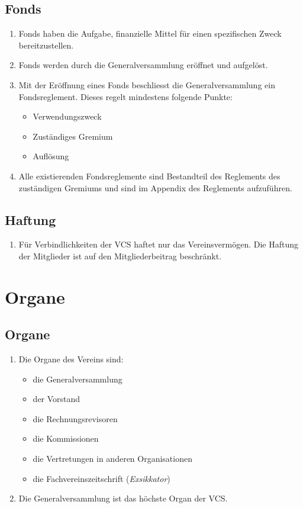 \subsection{Fonds}
\begin{enumerate}
  \item Fonds haben die Aufgabe, finanzielle Mittel für einen spezifischen Zweck bereitzustellen.
  \item Fonds werden durch die Generalversammlung eröffnet und aufgelöst.
  \item Mit der Eröffnung eines Fonds beschliesst die Generalversammlung ein Fondsreglement. Dieses regelt mindestens folgende Punkte:
    \begin{itemize}
      \item Verwendungszweck
      \item Zuständiges Gremium
      \item Auflösung
    \end{itemize}
  \item Alle existierenden Fondsreglemente sind Bestandteil des Reglements des zuständigen Gremiums und sind im Appendix des Reglements aufzuführen.
\end{enumerate}

\subsection{Haftung}
\begin{enumerate}
\item Für Verbindlichkeiten der VCS haftet nur das Vereinsvermögen. Die Haftung der Mitglieder ist auf den Mitgliederbeitrag beschränkt.
\end{enumerate}

\section{Organe}

\subsection{Organe}
\begin{enumerate}
\item Die Organe des Vereins sind:
	\begin{itemize}
	\item die Generalversammlung
	\item der Vorstand
	\item die Rechnungsrevisoren
	\item die Kommissionen
	\item die Vertretungen in anderen Organisationen
	\item die Fachvereinszeitschrift (\textit{Exsikkator})
	\end{itemize}
\item Die Generalversammlung ist das höchste Organ der VCS.
\end{enumerate}

